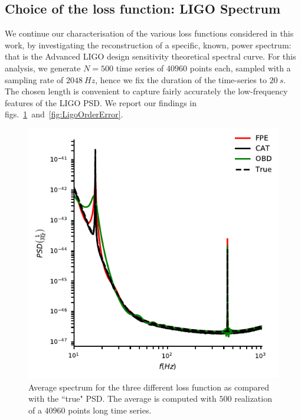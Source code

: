 \documentclass[twocolumn,showpacs,preprintnumbers,nofootinbib,prd,
superscriptaddress,10pt]{revtex4-1}
\begin{document}
\subsection{Choice of the loss function: LIGO Spectrum} \label{sec:LIGO_validation}
We continue our characterisation of the various loss functions considered in this work, by investigating the 
reconstruction of a specific, known, power spectrum: that is the Advanced LIGO design sensitivity theoretical spectral curve\cite{LIGO_PSDs}.
For this analysis, we generate $N = 500$ time series of $40960$ points each, sampled with a sampling rate of $\SI{2048}{Hz}$, hence we fix the duration
of the time-series to $\SI{20}{s}$. The chosen length is convenient to capture fairly accurately the low-frequency features of the LIGO PSD.
We report our findings in figs.~\ref{fig:ligospectrum}~and~\ref{fig:LigoOrderError}.

\begin{figure}
    \centering
     \includegraphics[width = \linewidth]{Images/optimisers_comparison/ligo/compare_estimates.pdf}
      \caption{Average spectrum for the three different loss function as compared with the ``true" PSD. The average is computed with $500$ realization of a $40960$ points long time series.}
       \label{fig:ligospectrum}
\end{figure}
\end{document}
